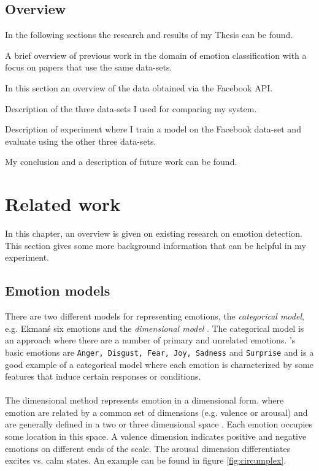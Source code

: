 \documentclass[
10pt, %
a4paper, %
oneside, %
headinclude,footinclude, %
BCOR5mm, %
]{scrartcl}
\begin{document}
\subsection{Overview}
In the following sections the research and results of my Thesis can be found.

\begin{description}[align=left]
\item [Section 2 - Related work] A brief overview of previous work in the domain of emotion classification with a focus on papers that use the same data-sets.
\item [Section 3 - Facebook data-set] In this section an overview of the data obtained via the Facebook API.
\item [Section 4 - Data-sets annotated with emotions] Description of the three data-sets I used for comparing my system.
\item [Section 5 - Experiment] Description of experiment where I train a model on the Facebook data-set and evaluate using the other three data-sets.
\item [Section 6 - Conclusions and future work] My conclusion and a description of future work can be found.
\end{description}
\clearpage


\section{Related work}
In this chapter, an overview is given on existing research on emotion detection. This section gives some more background information that can be helpful in my experiment.

\subsection{Emotion models}
There are two different models for representing emotions, the \textit{categorical model}, e.g. Ekman\'s six emotions\citep{ekman1992argument} and the \textit{dimensional model} \citep{russell2003core}. The categorical model is an approach where there are a number of primary and unrelated emotions. \citeauthor{ekman1992argument}'s basic emotions are \texttt{Anger, Disgust, Fear, Joy, Sadness} and \texttt{Surprise} and is a good example of a categorical model where each emotion is characterized by some features that induce certain responses  or conditions. \\\\
The dimensional method represents emotion in a dimensional form. where emotion are related by a common set of dimensions (e.g. valence or arousal) and are generally defined in a two or three dimensional space \citep{mohammad2015sentiment}. Each emotion occupies some location in this space. A valence dimension indicates positive and negative emotions on different ends of the scale. The arousal dimension differentiates excites vs. calm states. An example can be found in figure \ref{fig:circumplex}.
\end{document}
